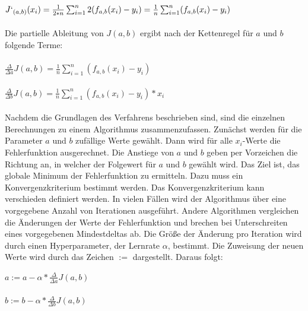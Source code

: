 \begin{enumerate}
$J`_{(a,b)} (x_i)=\frac{1}{2*n}\sum_{i=1}^{n} 2 (f_{a,b}(x_i)-y_i)= \frac{1}{n}\sum_{i=1}^{n}  (f_{a,b}(x_i)-y_i)$
\\\\
Die partielle Ableitung von $J (a,b)$ ergibt nach der Kettenregel für $a$ und $b$ folgende Terme:
\\\\
$\frac{\Delta}{\Delta a} J(a,b)= \frac{1}{n}\sum_{i=1}^{n} (f_{a,b} (x_i)-y_i)$
\\\\
$\frac{\Delta}{\Delta b} J(a,b)= \frac{1}{n}\sum_{i=1}^{n} (f_{a,b} (x_i)-y_i)*x_i$
\\\\
Nachdem die Grundlagen des Verfahrens beschrieben sind, sind die einzelnen Berechnungen zu einem Algorithmus zusammenzufassen. Zunächst werden für die Parameter $a$ und $b$ zufällige Werte gewählt. Dann wird für alle $x_i$-Werte die Fehlerfunktion ausgerechnet. Die Anstiege von $a$ und $b$ geben per Vorzeichen die Richtung an, in welcher der Folgewert für $a$ und $b$ gewählt wird. Das Ziel ist, das globale Minimum der Fehlerfunktion zu ermitteln. Dazu muss ein Konvergenzkriterium bestimmt werden. Das Konvergenzkriterium kann verschieden definiert werden. In vielen Fällen wird der Algorithmus über eine vorgegebene Anzahl von Iterationen ausgeführt. Andere Algorithmen vergleichen die Änderungen der Werte der Fehlerfunktion und brechen bei Unterschreiten eines vorgegebenen Mindestdeltas ab. Die Größe der Änderung pro Iteration wird durch einen Hyperparameter, der Lernrate $\alpha$, bestimmt. Die Zuweisung der neuen Werte wird durch das Zeichen $:=$ dargestellt. Daraus folgt:

$a:= a - \alpha * \frac{\Delta}{\Delta a} J(a,b)$
\\\\
$b:= b - \alpha * \frac{\Delta}{\Delta b} J(a,b)$


\end{enumerate}
